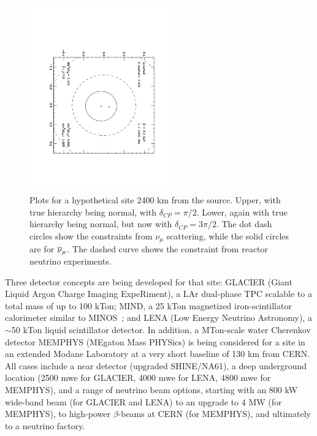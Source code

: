 \begin{figure}[!h]
\begin{center}
\includegraphics[width=2.45in,angle=90]{RNC/cpv_wash_threepibytwo_inv.pdf}
\caption{ Plots for a hypothetical site 2400 km from the source.  Upper, with true hierarchy being normal, with $\delta_{CP}=\pi/2$.  Lower, again with true hierarchy being normal, but now with $\delta_{CP}=3\pi/2$. The dot dash circles show the constraints from $\nu_\mu$ scattering, while the solid circles are for $\overline\nu_\mu$.   The dashed curve shows the constraint from reactor neutrino experiments. \label{fig_three}}
\end{center}
\vspace{-1.4cm}
\end{figure}


Three detector concepts are being developed for
that site: GLACIER (Giant Liquid Argon Charge Imaging ExpeRiment), a
LAr dual-phase TPC scalable to a total mass of up to 100 kTon; MIND,
a 25 kTon magnetized iron-scintillator calorimeter similar to
MINOS~\cite{nonus:LBNO_LOI}; and
LENA (Low Energy Neutrino Astronomy), a $\sim$50 kTon liquid
scintillator detector. In addition, a MTon-scale water Cherenkov
detector MEMPHYS (MEgaton Mass PHYSics) is being considered for a site
in an extended 
Modane Laboratory at a very short baseline of 130 km from CERN. All
cases include a near detector (upgraded SHINE/NA61), a deep
underground location (2500 mwe for GLACIER, 4000 mwe for LENA, 4800
mwe for MEMPHYS), and a range of neutrino beam options, starting with
an 800 kW wide-band beam (for GLACIER and LENA) to an upgrade to 4 MW
(for MEMPHYS), to high-power $\beta$-beams at CERN (for MEMPHYS), and
ultimately to a neutrino factory. 





